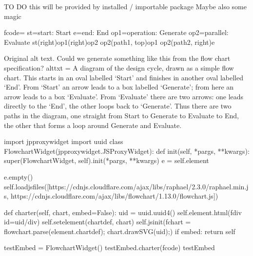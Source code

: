 \documentclass[letterpaper,10pt,english]{sphinxmanual}
\begin{document}
{
\begin{sphinxVerbatim}[commandchars=\\\{\}]
\llap{\color{nbsphinxin}[ ]:\,\hspace{\fboxrule}\hspace{\fboxsep}}\PYGZsh{} TO DO \PYGZhy{} this will be provided by installed / importable package
\PYGZsh{} Maybe also some magic

fcode=\PYGZsq{}\PYGZsq{}\PYGZsq{}
st=\PYGZgt{}start: Start
e=\PYGZgt{}end: End
op1=\PYGZgt{}operation: Generate
op2=\PYGZgt{}parallel: Evaluate
st(right)\PYGZhy{}\PYGZgt{}op1(right)\PYGZhy{}\PYGZgt{}op2
op2(path1, top)\PYGZhy{}\PYGZgt{}op1
op2(path2, right)\PYGZhy{}\PYGZgt{}e
\PYGZsq{}\PYGZsq{}\PYGZsq{}

\PYGZsh{}Original alt text.
\PYGZsh{} Could we generate something like this from the flow chart specification?
alt\PYGZus{}txt = \PYGZdq{}\PYGZdq{}\PYGZdq{}
A diagram of the design cycle, drawn as a simple flow chart.
This starts in an oval labelled ‘Start’ and finishes in another oval labelled ‘End’.
From ‘Start’ an arrow leads to a box labelled ‘Generate’;
from here an arrow leads to a box ‘Evaluate’.
From ‘Evaluate’ there are two arrows:
one leads directly to the ‘End’, the other loops back to ‘Generate’.
Thus there are two paths in the diagram,
one straight from Start to Generate to Evaluate to End,
the other that forms a loop around Generate and Evaluate.\PYGZdq{}\PYGZdq{}\PYGZdq{}

import jp\PYGZus{}proxy\PYGZus{}widget
import uuid
class FlowchartWidget(jp\PYGZus{}proxy\PYGZus{}widget.JSProxyWidget):
    def \PYGZus{}\PYGZus{}init\PYGZus{}\PYGZus{}(self, *pargs, **kwargs):
        super(FlowchartWidget, self).\PYGZus{}\PYGZus{}init\PYGZus{}\PYGZus{}(*pargs, **kwargs)
        e = self.element

        e.empty()
        self.load\PYGZus{}js\PYGZus{}files([\PYGZdq{}https://cdnjs.cloudflare.com/ajax/libs/raphael/2.3.0/raphael.min.js\PYGZdq{},
                            \PYGZsq{}https://cdnjs.cloudflare.com/ajax/libs/flowchart/1.13.0/flowchart.js\PYGZsq{}])

    def charter(self, chart, embed=False):
        uid = uuid.uuid4()
        self.element.html(f\PYGZsq{}\PYGZlt{}div id=\PYGZdq{}\PYGZob{}uid\PYGZcb{}\PYGZdq{}\PYGZgt{}\PYGZlt{}/div\PYGZgt{}\PYGZsq{})
        self.set\PYGZus{}element(\PYGZdq{}chartdef\PYGZdq{}, chart)
        self.js\PYGZus{}init(f\PYGZdq{}chart = flowchart.parse(element.chartdef); chart.drawSVG(\PYGZsq{}\PYGZob{}uid\PYGZcb{}\PYGZsq{});\PYGZdq{})
        if embed:
            return self

testEmbed = FlowchartWidget()
testEmbed.charter(fcode)
testEmbed

\end{sphinxVerbatim}
}
\end{document}
